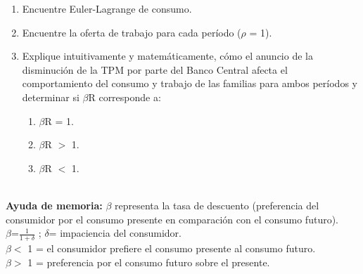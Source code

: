 \documentclass[a4paper,12pt]{article}
\begin{document}
\begin{enumerate}[label=\alph*)]
\item Encuentre Euler-Lagrange de consumo.
\item Encuentre la oferta de trabajo para cada período (\(\rho\)  = 1).
\item Explique intuitivamente y matemáticamente, cómo el anuncio de la disminución de la TPM por parte del Banco Central
afecta el comportamiento del consumo y trabajo de las familias para ambos períodos y determinar si $\beta$R corresponde a:

\begin{enumerate}[label=\alph*.\arabic*)]
        \item $\beta$R = 1.
        \item $\beta$R $>$ 1.
        \item $\beta$R $<$ 1.
    \end{enumerate}
\end{enumerate}
\\

\noindent
\textbf{Ayuda de memoria:} $\beta$ representa la tasa de descuento (preferencia del consumidor por el consumo presente en comparación con el consumo futuro).
\\

\noindent
$\beta$=$\frac{1}{1+\delta}$ ; $\delta$= impaciencia del consumidor. 
\noindent
\\
$\beta$$<$ 1 = el consumidor prefiere el consumo presente al consumo futuro.
\noindent
\\
$\beta$$>$ 1 = preferencia por el consumo futuro sobre el presente.
\end{document}
